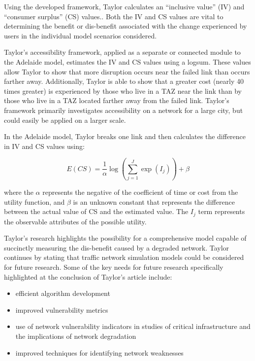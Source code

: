 Using the developed framework, Taylor calculates an ``inclusive value'' (IV)
and ``consumer surplus'' (CS) values.. Both the IV and CS values are vital to
determining the benefit or dis-benefit
associated with the change experienced by users in the individual model
scenarios considered.

Taylor's accessibility framework, applied as a separate or connected module to
the Adelaide model, estimates the IV and CS values using a logsum.
These values allow Taylor to show that more disruption occurs near the
failed link than occurs farther away. Additionally, Taylor is able to show
that a greater cost (nearly 40 times greater) is experienced by those who
live in a TAZ near the link than by those who live in a TAZ located
farther away from the failed link. Taylor's framework primarily
investigates accessibility on a network for a large city,
but could easily be applied on a larger scale.

In the Adelaide model, Taylor breaks one link and
then calculates the difference in IV and CS values using:

	\begin{equation}
		E(CS) = \frac{1}{\alpha} \log (\sum_{j = 1}^{J} \exp (I_j)) + \beta
			\label{eqn:taylor}
	\end{equation}

\noindent where the \(\alpha\) represents the negative of the coefficient of time or cost from the utility function,
and \(\beta\) is an unknown constant that represents the difference between the actual value of CS and the estimated value.
The \(I_j\) term represents the observable attributes of the possible utility.

Taylor's research highlights the possibility for a comprehensive model capable
of succinctly measuring the dis-benefit caused by a degraded network.
Taylor continues by stating that traffic network simulation models
could be considered for future research. Some of the key needs for
future research specifically highlighted at the conclusion of Taylor's article include:

	\begin{itemize}
		\item efficient algorithm development
		\item improved vulnerability metrics
		\item use of network vulnerability indicators in studies of critical
		infrastructure and the implications of network degradation
		\item improved techniques for identifying network weaknesses
	\end{itemize}

